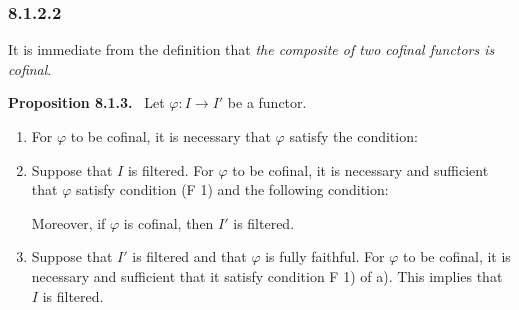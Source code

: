 \documentclass[11pt]{article}
\newcommand{\Hom}{\operatorname{Hom}}
\newenvironment{statement}[1]{\par\medskip\noindent\textbf{#1.}\ }{\par\medskip}
\begin{document}
\subsubsection*{8.1.2.2}
It is immediate from the definition that \emph{the composite of two cofinal functors is cofinal}.

\begin{statement}{Proposition 8.1.3}
Let $\varphi:I\to I'$ be a functor.
\begin{enumerate}[label=\alph*)]
\item For $\varphi$ to be cofinal, it is necessary that $\varphi$ satisfy the condition:

\item Suppose that $I$ is filtered. For $\varphi$ to be cofinal, it is necessary and sufficient that $\varphi$ satisfy condition \textup{(F 1)} and the following condition:
Moreover, if $\varphi$ is cofinal, then $I'$ is filtered.

\item Suppose that $I'$ is filtered and that $\varphi$ is fully faithful. For $\varphi$ to be cofinal, it is necessary and sufficient that it satisfy condition \textup{F 1)} of \textup{a)}. This implies that $I$ is filtered.
\end{enumerate}
\end{statement}
\end{document}
